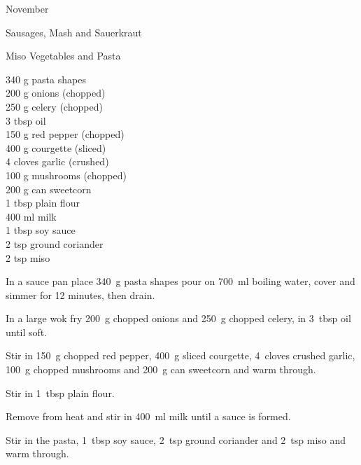 \begin{menu}{November}
\begin{recipe}{2}{Sausages, Mash and Sauerkraut}
\begin{instructions}
    \end{instructions}
    \end{recipe}%
  
    \begin{recipe}{2}{Miso Vegetables and Pasta}%
		\begin{ingredients}
		340 g pasta shapes  \\
	200 g onions (chopped) \\
	250 g celery (chopped) \\
	3 tbsp oil  \\
	150 g red pepper (chopped) \\
	400 g courgette (sliced) \\
	4 cloves garlic (crushed) \\
	100 g mushrooms (chopped) \\
	200 g can sweetcorn  \\
	1 tbsp plain flour  \\
	400 ml milk  \\
	1 tbsp soy sauce  \\
	2 tsp ground coriander  \\
	2 tsp miso  \\
	
		\end{ingredients}
	
	
    \begin{instructions}
    \item 
    In a
    sauce pan
    place
    340~g  pasta shapes
    pour on
    700~ml  boiling water,
    cover and simmer for 12 minutes, then drain.
  \item 
        In a large wok fry
        200~g chopped onions
        and
        250~g chopped celery,
        in
        3~tbsp  oil
        until soft.
      \item 
        Stir in
        150~g chopped red pepper,
        400~g sliced courgette,
        4~cloves crushed garlic,
        100~g chopped mushrooms
        and
        200~g  can sweetcorn
        and warm through.
      \item 
        Stir in
        1~tbsp  plain flour.
      \item 
        Remove from heat and stir in
        400~ml  milk
        until a sauce is formed.
      \item 
        Stir in
        the pasta,
        1~tbsp  soy sauce,
        2~tsp  ground coriander
        and
        2~tsp  miso
        and warm through.
      

\end{instructions}
\end{recipe}
\end{menu}
